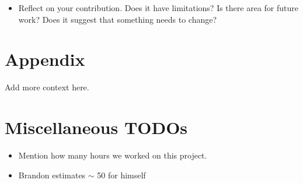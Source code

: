 \documentclass[letterpaper,12pt]{article}
\begin{document}
\begin{itemize}
  \item Reflect on your contribution. Does it have limitations? Is there area for future work? Does it suggest that something needs to change?
\end{itemize}

\section{Appendix}

Add more context here.

\section{Miscellaneous TODOs}

\begin{itemize}
  \item Mention how many hours we worked on this project.
  \item Brandon estimates $\sim$ 50 for himself
\end{itemize}



\end{document}

